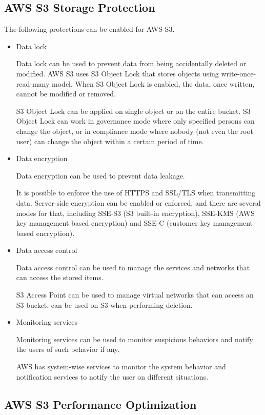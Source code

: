 \subsection{AWS S3 Storage Protection}

The following protections can be enabled for AWS S3.
\begin{itemize}
	\item Data lock
	
	Data lock can be used to prevent data from being accidentally deleted or modified. AWS S3 uses S3 Object Lock that stores objects using write-once-read-many model. When S3 Object Lock is enabled, the data, once written, cannot be modified or removed. 
	
	S3 Object Lock can be applied on single object or on the entire bucket. S3 Object Lock can work in governance mode where only specified persons can change the object, or in compliance mode where nobody (not even the root user) can change the object within a certain period of time.
	
	\item Data encryption
	
	Data encryption can be used to prevent data leakage.
	
	It is possible to enforce the use of HTTPS and SSL/TLS when transmitting data. Server-side encryption can be enabled or enforced, and there are several modes for that, including SSE-S3 (S3 built-in encryption), SSE-KMS (AWS key management based encryption) and SSE-C (customer key management based encryption).
	
	\item Data access control
	
	Data access control can be used to manage the services and networks that can access the stored items.
	
	S3 Access Point can be used to manage virtual networks that can access an S3 bucket.  can be used on S3 when performing deletion.
	
	\item Monitoring services
	
	Monitoring services can be used to monitor suspicious behaviors and notify the users of such behavior if any.
	
	AWS has system-wise services to monitor the system behavior and notification services to notify the user on different situations.
\end{itemize}

\subsection{AWS S3 Performance Optimization}

